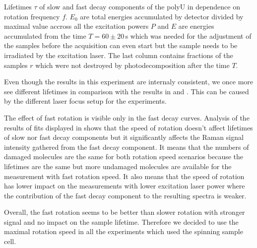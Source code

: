 \begin{table}
	\centering
	
	\caption{Lifetimes $\tau$ of slow and fast decay components of the polyU in
		dependence on rotation frequency $f$. $E_0$ are total energies accumulated
		by detector divided by maximal value accross all the excitation powers $P$
		and $E$ are energies accumulated from the time $T = 60\pm20$\,s which was
		needed for the adjustment of the samples before the acquisition can even
		start but the sample needs to be irradiated by the excitation laser. The
		last column contains fractions of the samples $r$ which were not destroyed
		by photodecomposition after the time $T$.
	}
	\label{\tablabel{rotation_optim:lifetimes}}
\end{table}

Even though the results in this experiment are internaly consistent, we once
more see different lifetimes in comparison with the results in
and
.
This can be caused by the different laser focus setup for the experiments.

The effect of fast rotation is visible only in the fast decay curves.
Analysis of the results of fits displayed in
shows that the speed of rotation doesn't affect lifetimes of slow nor fast
decay components but it significantly affects the Raman signal intensity
gathered from the fast decay component.
It means that the numbers of damaged molecules are the same for both rotation
speed scenarios because the lifetimes are the same but more undamaged molecules
are available for the measurement with fast rotation speed.
It also means that the speed of rotation has lower impact on the measurements
with lower excitation laser power where the contribution of the fast decay
component to the resulting spectra is weaker.

Overall, the fast rotation seems to be better than slower rotation with
stronger signal and no impact on the sample lifetime.
Therefore we decided to use the maximal rotation speed in all the experiments
which used the spinning sample cell.